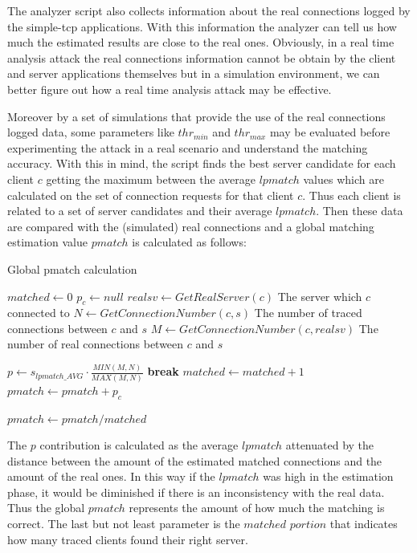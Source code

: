 The analyzer script also collects information about the
real connections logged by the simple-tcp applications. With this
information the analyzer can tell us how much the estimated results are
close to the real ones. Obviously, in a real time analysis attack the real connections
information cannot be obtain by the client and server applications themselves 
but in a simulation environment, we can better figure out how a real
time analysis attack may be effective.

Moreover by a set of simulations
that provide the use of the real connections logged data, some
parameters like $thr_{min}$ and $thr_{max}$ may be evaluated before 
experimenting the attack in a real scenario and understand the matching
accuracy. 
With this in mind, the script
finds the best server candidate for each client $c$ getting the maximum
between the average
$lpmatch$ values
which are calculated on the set of connection requests for that
client $c$. Thus each client is related to a set of server candidates
and their average $lpmatch$.
Then these data are
compared with the (simulated) real connections and a global matching
estimation value $pmatch$ is calculated as follows:

\begin{algorithm}[H]
\caption{Global pmatch calculation}
\begin{algorithmic}
\State $matched \gets 0$
	\State $p_c \gets null$
	\State $realsv \gets GetRealServer(c)$ 
	{\footnotesize \Comment The server which $c$ connected to}
			\State $N \gets GetConnectionNumber(c, s) $ 
			{\footnotesize \Comment The number of traced connections between $c$ and $s$}
			\State $M \gets GetConnectionNumber(c, realsv)$ 
			{\footnotesize \Comment The number of real connections between $c$ and $s$}
 
			\State $p \gets s_{lpmatch\_AVG} \cdot \frac{ MIN(M, N)}{
MAX(M, N)}$
		\State \textbf{break}
		\EndIf
	\EndFor
		\State $matched \gets matched + 1$
		\State $pmatch \gets pmatch + p_c$
	\EndIf	
\EndFor

\State $pmatch \gets pmatch / matched$

\end{algorithmic}
\label{alg:launcher}
\end{algorithm}
 
The $p$ contribution is calculated as the average
$lpmatch$ attenuated by the distance between the amount of the estimated matched connections
and the amount of the real ones. In this way if the $lpmatch$ was high
in the estimation phase, it would be diminished if there is an
inconsistency with the real data.
Thus the global $pmatch$ represents the amount of how much the matching
is correct.
The last but not least parameter is the $matched$ $portion$ that indicates
how many traced clients found their right server. 


